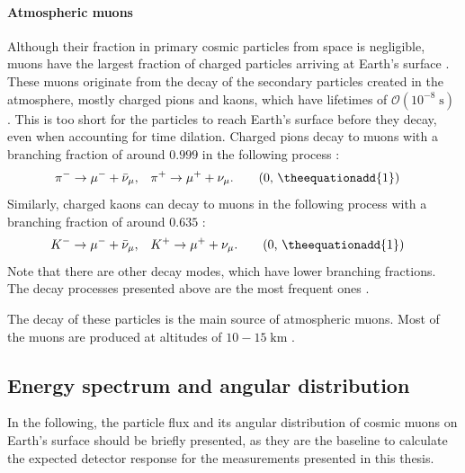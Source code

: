 \paragraph{Atmospheric muons}
Although their fraction in primary cosmic particles from space is negligible, muons have the largest fraction of charged particles arriving at Earth's surface \cite{PDG2022}. These muons originate from the decay of the secondary particles created in the atmosphere, mostly charged pions and kaons, which have lifetimes of $\mathcal{O}(10^{-8}\;\si{\second})$ \cite{PDG2024}. This is too short for the particles to reach Earth's surface before they decay, even when accounting for time dilation. Charged pions decay to muons with a branching fraction of around $0.999$ in the following process \cite{PDG2024}:
\begin{align}
    \pi^- &\rightarrow \mu^- + \bar{\nu}_\mu,
    &
    \pi^+ &\rightarrow \mu^+ + \nu_\mu.
\tag{\theequation, \theequationadd{1}}
\end{align}
 \hspace{-0.7em}
Similarly, charged kaons can decay to muons in the following process with a branching fraction of around $0.635$ \cite{PDG2024}:
\begin{align}
    K^- &\rightarrow \mu^- + \bar{\nu}_\mu,
    &
    K^+ &\rightarrow \mu^+ + \nu_\mu.
\tag{\theequation, \theequationadd{1}}
\end{align}
 \hspace{-0.7em}
Note that there are other decay modes, which have lower branching fractions. The decay processes presented above are the most frequent ones \cite{PDG2024}.
\par The decay of these particles is the main source of atmospheric muons. Most of the muons are produced at altitudes of $10-15\;\si{\kilo\meter}$ \cite{PDG2022,CosmicMuon-Shukla}.


\subsection{Energy spectrum and angular distribution}
\label{sec:AtmosphericMuons-Dependencies}
In the following, the particle flux and its angular distribution of cosmic muons on Earth's surface should be briefly presented, as they are the baseline to calculate the expected detector response for the measurements presented in this thesis.
